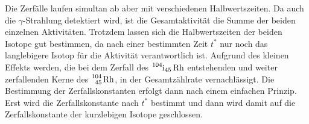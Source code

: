 Die Zerfälle laufen simultan ab aber mit verschiedenen Halbwertszeiten. Da auch die $\gamma$-Strahlung detektiert wird, ist die Gesamtaktivität die Summe der beiden einzelnen Aktivitäten.
Trotzdem lassen sich die Halbwertszeiten der beiden Isotope gut bestimmen, da nach einer bestimmten Zeit $t^*$ nur noch das langlebigere Isotop für die Aktivität verantwortlich ist.
Aufgrund des kleinen Effekts werden, die bei dem Zerfall des $\ce{^104i_45 Rh}$ entstehenden und weiter zerfallenden Kerne des $\ce{^104_45 Rh}$, in der Gesamtzählrate vernachlässigt. 
Die Bestimmung der Zerfallskonstanten erfolgt dann nach einem einfachen Prinzip. Erst wird die Zerfallskonstante nach $t^*$ bestimmt und dann wird damit auf die Zerfallskonstante der kurzlebigen Isotope geschlossen.